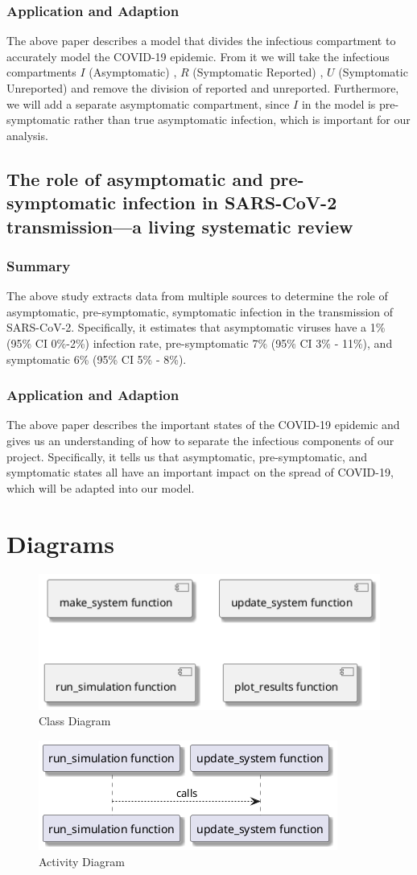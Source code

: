 \documentclass{article}
\begin{document}
\subsubsection{Application and Adaption}
The above paper describes a model that divides the infectious compartment to accurately model the COVID-19 epidemic. From it we will take the infectious compartments $I$ (Asymptomatic) , $R$ (Symptomatic Reported) , $U$ (Symptomatic Unreported) and remove the division of reported and unreported. Furthermore, we will add a separate asymptomatic compartment, since $I$ in the model is pre-symptomatic rather than true asymptomatic infection, which is important for our analysis.

\subsection{The role of asymptomatic and pre-symptomatic infection in SARS-CoV-2 transmission—a living systematic review}
\subsubsection{Summary}
The above study extracts data from multiple sources to determine the role of asymptomatic, pre-symptomatic, symptomatic infection in the transmission of SARS-CoV-2. Specifically, it estimates that asymptomatic viruses have a 1\% (95\% CI 0\%-2\%) infection rate, pre-symptomatic 7\% (95\% CI 3\% - 11\%), and symptomatic 6\% (95\% CI 5\% - 8\%).

\cite{review}
\subsubsection{Application and Adaption}
The above paper describes the important states of the COVID-19 epidemic and gives us an understanding of how to separate the infectious components of our project. Specifically, it tells us that asymptomatic, pre-symptomatic, and symptomatic states all have an important impact on the spread of COVID-19, which will be adapted into our model.

\section{Diagrams}
\begin{figure}[H]
  \center
  \includegraphics[scale=0.5]{A-2}
  \caption{Class Diagram}
\end{figure}

\begin{figure}[H]
  \center
  \includegraphics[scale=0.5]{A-3}
  \caption{Activity Diagram}
\end{figure}


\newpage
\printbibliography
\end{document}
